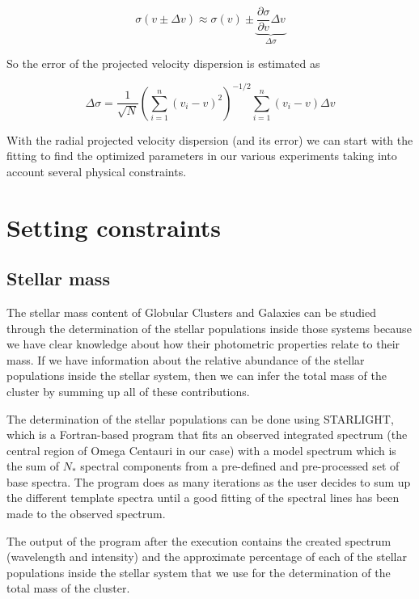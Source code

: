 \begin{equation}
\sigma(v\pm\Delta v)\approx \sigma(v)\pm \underbrace{\frac{\partial \sigma}{\partial v}\Delta v}_{\Delta \sigma}
\end{equation}

So the error of the projected velocity dispersion is estimated as

\begin{equation}
\Delta \sigma = \frac{1}{\sqrt{N}}\left(\sum_{i=1}^{n}\left(v_{i}-v\right)^{2}\right)^{-1/2}\sum_{i=1}^{n}\left(v_{i}-v\right)\Delta v
\end{equation}

With the radial projected velocity dispersion (and its error) we can start with the fitting to find the optimized parameters in our various experiments taking into account several physical constraints. 

\section{Setting constraints}

\subsection{Stellar mass}

The stellar mass content of Globular Clusters and Galaxies can be studied through the determination of the stellar populations inside those systems because we have clear knowledge about how their photometric properties relate to their mass. If we have information about the relative abundance of the stellar populations inside the stellar system, then we can infer the total mass of the cluster by summing up all of these contributions. 

The determination of the stellar populations can be done using STARLIGHT, which is a Fortran-based program that fits an observed integrated spectrum (the central region of Omega Centauri in our case) with a model spectrum which is the sum of $N_{*}$ spectral components from a pre-defined and pre-processed set of base spectra. The program does as many iterations as the user decides to sum up the different template spectra until a good fitting of the spectral lines has been made to the observed spectrum. 

The output of the program after the execution contains the created spectrum (wavelength and intensity) and the approximate percentage of each of the stellar populations inside the stellar system that we use for the determination of the total mass of the cluster.

